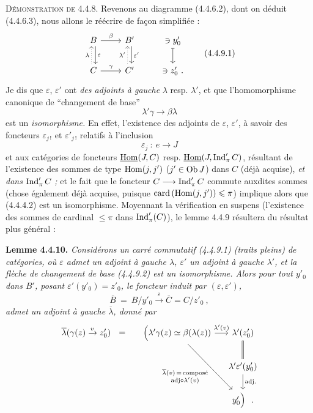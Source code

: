 \textsc{Démonstration de} 4.4.8. Revenons au diagramme (4.4.6.2), dont on déduit (4.4.6.3), nous allons le réécrire de façon simplifiée :
\[
\begin{tikzcd}
B \arrow[r, "\beta"] \arrow[d, shift left, "\varepsilon"] & B' \arrow[d, shift left, "\varepsilon'"] & \ni y'_0 \arrow[d, mapsto] \\
C \arrow[r, "\gamma"] \arrow[u, dotted, shift left, "\lambda"] & C' \arrow[u, dotted, shift left, "\lambda'"] & \ni z'_0\ .
\end{tikzcd}
\tag*{(4.4.9.1)}
\]
Je dis que $\varepsilon$, $\varepsilon'$ ont \textit{des adjoints à gauche} $\lambda$ resp. $\lambda'$, et que l'homomorphisme canonique de “changement de base”
\[
\lambda'\gamma \longrightarrow \beta\lambda \tag*{(4.4.9.2)}
\]
est un \textit{isomorphisme.} En effet, l'existence des adjoints de $\varepsilon$, $\varepsilon'$, à savoir des foncteurs $\varepsilon_{j\,!}$ et $\varepsilon'_{j\,!}$ relatifs à l'inclusion
\[
\varepsilon_j \ :\ e \longrightarrow J
\]
et aux catégories de foncteurs $\underline{\mathrm{Hom}}(J,C)$ resp. $\underline{\mathrm{Hom}}(J,\operatorname{Ind}'_\pi C)$, résultant de l'existence des sommes de type $\mathrm{Hom}(j,j')$ ($j' \in \mathrm{Ob}\, J$) dans $C$ (déjà acquise), \textit{et dans} $\operatorname{Ind}'_\pi C$\textit{ ;} et le fait que le foncteur $C \longrightarrow \operatorname{Ind}'_\pi C$ commute
auxdites sommes (chose également déjà acquise, puisque $\operatorname{card}\, (\mathrm{Hom}(j,j')) \leqslant \pi$) implique alors que (4.4.4.2) est un isomorphisme. Moyennant la vérification en suspens (l'existence %
des sommes de cardinal $\leqslant \pi$ dans $\operatorname{Ind}'_\pi(C)$), le lemme 4.4.9 résultera du résultat plus général :

\textbf{Lemme 4.4.10.} \textit{Considérons un carré commutatif (4.4.9.1) (traits pleins) de catégories, où $\varepsilon$ admet un adjoint à gauche $\lambda$, $\varepsilon'$ un adjoint à gauche $\lambda'$, et la flèche de changement de base (4.4.9.2) est un isomorphisme. Alors pour tout $y'_0$ dans $B'$, posant $\varepsilon'(y'_0) = z'_0$, le foncteur induit par $(\varepsilon, \varepsilon')$,}
\[
\overline{B} \ =\ B/y'_0 \xrightarrow{\bar{\varepsilon}} \overline{C} = C/z'_0\ ,
\]
\textit{admet un adjoint à gauche $\overline{\lambda}$, donné par}
\[
\begin{tikzcd}[column sep=small]
\overline{\lambda}(\gamma(z) \xrightarrow{v} z'_0) \ \ = & \Bigl(\lambda'\gamma(z) \simeq \beta(\lambda(z)) \arrow[r, "{\lambda'(v)}"] \arrow[ddr, "{\substack{\overline{\lambda}(v) \,=\, \text{composé}\\ \text{adj} \circ \lambda'(v)}}"'] & \lambda'(z'_0) \arrow[d, equal] \\
 & & \lambda'\varepsilon'(y'_0) \arrow[d, "\text{adj.}"] \\
 & & y'_0\Bigr)\ \ .
\end{tikzcd}
\]

